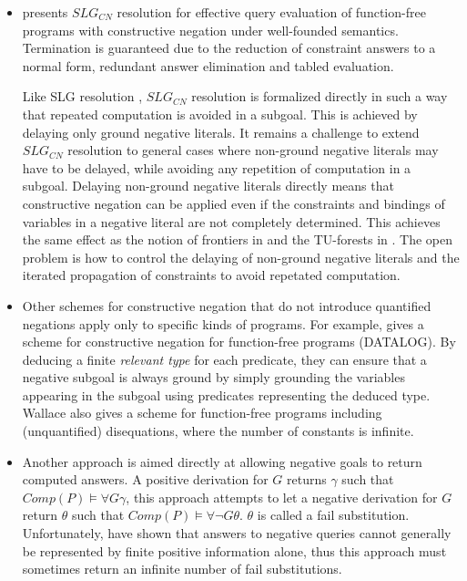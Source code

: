 \documentclass{tlp}
\begin{document}
\begin{itemize}
\item \cite{Liu99} presents $SLG_{CN}$ resolution for effective
query evaluation of function-free programs with constructive negation
under well-founded semantics. Termination is guaranteed due to the
reduction of constraint answers to a normal form, redundant answer
elimination and tabled evaluation.

Like SLG resolution \cite{Chen}, $SLG_{CN}$ resolution is formalized
directly in such a way that repeated computation is avoided in a
subgoal. This is achieved by delaying only ground negative
literals. It remains a challenge to extend $SLG_{CN}$ resolution to
general cases where non-ground negative literals may have to be
delayed, while avoiding any repetition of computation in a
subgoal. Delaying non-ground negative literals directly means that
constructive negation can be applied even if the constraints and
bindings of variables in a negative literal are not completely
determined. This achieves the same effect as the notion of frontiers
in \cite{Drabent,Fages} and the TU-forests in \cite{Damasio}. The
open problem is how to control the delaying of non-ground negative
literals and the iterated propagation of constraints to avoid
repetated computation.

\item Other schemes for constructive negation that do not introduce
quantified negations apply only to specific kinds of programs. For
example, \cite{Foo} gives a scheme for constructive negation for
function-free programs (DATALOG). By deducing a finite \emph{relevant
type} for each predicate, they can ensure that a negative subgoal is
always ground by simply grounding the variables appearing in the
subgoal using predicates representing the deduced type. Wallace \cite{Wallace}
also gives a scheme for function-free programs including
(unquantified) disequations, where the number of constants is
infinite.

\item Another approach \cite{Malus} is aimed directly at allowing
negative goals to return computed answers. A positive derivation for
$G$ returns $\gamma$ such that $Comp(P) \models \forall G \gamma$,
this approach attempts to let a negative derivation for $G$ return
$\theta$ such that $Comp(P) \models \forall \neg G \theta$. $\theta$
is called a fail substitution. Unfortunately, \cite{Lassez} have shown
that answers to negative queries cannot generally be represented by
finite positive information alone, thus this approach must sometimes
return an infinite number of fail substitutions.


\end{itemize}
\end{document}

